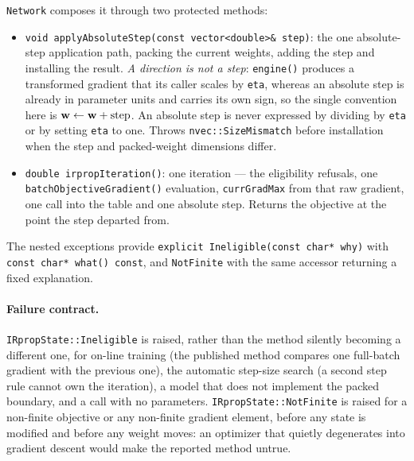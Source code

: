 \texttt{Network} composes it through two protected methods:

\begin{itemize}
\item \texttt{void applyAbsoluteStep(const vector<double>\& step)}: the one
      absolute-step application path, packing the current weights, adding the
      step and installing the result.  \emph{A direction is not a step}:
      \texttt{engine()} produces a transformed gradient that its caller scales
      by \texttt{eta}, whereas an absolute step is already in parameter units
      and carries its own sign, so the single convention here is
      ${\bf w} \leftarrow {\bf w} + \mathrm{step}$.  An absolute step is never
      expressed by dividing by \texttt{eta} or by setting \texttt{eta} to one.
      Throws \texttt{nvec::SizeMismatch} before installation when the step and
      packed-weight dimensions differ.
\item \texttt{double irpropIteration()}: one iteration --- the eligibility
      refusals, one \texttt{batchObjectiveGradient()} evaluation,
      \texttt{currGradMax} from that raw gradient, one call into the table and
      one absolute step.  Returns the objective at the point the step departed
      from.
\end{itemize}

The nested exceptions provide
\texttt{explicit Ineligible(const char* why)} with
\texttt{const char* what() const}, and \texttt{NotFinite} with the same
accessor returning a fixed explanation.

\paragraph{Failure contract.}  \texttt{IRpropState::Ineligible} is raised, rather
than the method silently becoming a different one, for on-line training (the
published method compares one full-batch gradient with the previous one), the
automatic step-size search (a second step rule cannot own the iteration), a
model that does not implement the packed boundary, and a call with no
parameters.  \texttt{IRpropState::NotFinite} is raised for a non-finite
objective or any non-finite gradient element, before any state is modified and
before any weight moves: an optimizer that quietly degenerates into gradient
descent would make the reported method untrue.

